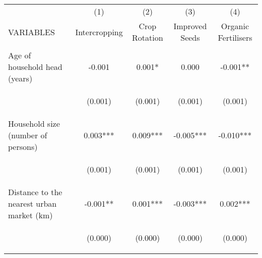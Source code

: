 \begin{center}
\begin{tabular}{lcccc} \hline
 & (1) & (2) & (3) & (4) \\
VARIABLES & Intercropping & Crop Rotation & Improved Seeds & Organic Fertilisers \\ \hline
\vspace{4pt} & \begin{footnotesize}\end{footnotesize} & \begin{footnotesize}\end{footnotesize} & \begin{footnotesize}\end{footnotesize} & \begin{footnotesize}\end{footnotesize} \\
Age of household head (years) & -0.001 & 0.001* & 0.000 & -0.001** \\
\vspace{4pt} & \begin{footnotesize}(0.001)\end{footnotesize} & \begin{footnotesize}(0.001)\end{footnotesize} & \begin{footnotesize}(0.001)\end{footnotesize} & \begin{footnotesize}(0.001)\end{footnotesize} \\
Household size (number of persons) & 0.003*** & 0.009*** & -0.005*** & -0.010*** \\
\vspace{4pt} & \begin{footnotesize}(0.001)\end{footnotesize} & \begin{footnotesize}(0.001)\end{footnotesize} & \begin{footnotesize}(0.001)\end{footnotesize} & \begin{footnotesize}(0.001)\end{footnotesize} \\
Distance to the nearest urban market (km) & -0.001** & 0.001*** & -0.003*** & 0.002*** \\
\vspace{4pt} & \begin{footnotesize}(0.000)\end{footnotesize} & \begin{footnotesize}(0.000)\end{footnotesize} & \begin{footnotesize}(0.000)\end{footnotesize} & \begin{footnotesize}(0.000)\end{footnotesize} \\

\end{tabular}
\end{center}
